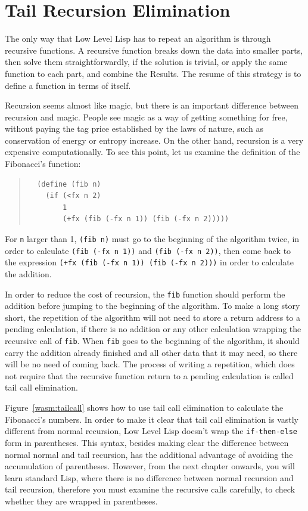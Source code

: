 \documentclass[a4paper,12pt]{book}
\begin{document}
\section{Tail Recursion Elimination}
The only way that Low Level Lisp has
to repeat an algorithm is through
recursive functions. A recursive function 
breaks down the data into smaller parts,
then solve them straightforwardly,
if the solution is trivial, or apply
the same function to each part, and combine
the Results. The resume of this strategy
is to define a function in terms of itself.

Recursion seems almost like magic, but there
is an important difference between recursion
and magic. People see magic as a way of getting
something for free, without paying the tag price
established by the laws of nature, such as 
conservation of energy or entropy increase.
On the other hand, recursion is a very expensive
computationally. To see this point, let us examine
the definition of the Fibonacci's function:
\begin{quote}
\begin{verbatim}
  (define (fib n)
    (if (<fx n 2)
        1
        (+fx (fib (-fx n 1)) (fib (-fx n 2)))))
\end{verbatim}
\end{quote}
For \verb|n| larger than 1, \verb|(fib n)| must
go to the beginning of the algorithm twice,
in order to calculate \verb|(fib (-fx n 1))|
and \verb|(fib (-fx n 2))|, then come back
to the expression
\verb|(+fx (fib (-fx n 1)) (fib (-fx n 2)))|
in order to calculate the addition.

In order to reduce the cost of recursion, the
\verb|fib| function should perform the addition
before jumping to the beginning of the algorithm.
To make a long story short, the repetition of the
algorithm will not need to store a return address
to a pending calculation, if there is no addition
or any other calculation wrapping the recursive
call of \verb|fib|. When \verb|fib| goes to the
beginning of the algorithm, it should carry the
addition already finished and all other data that it
may need, so there will be no need of coming back.
The process of writing a repetition, which does not
require that the recursive function return to
a pending calculation is called tail call elimination.

Figure~\ref{wasm:tailcall} shows how to use tail
call elimination to calculate the Fibonacci's numbers.
In order to make it clear that tail call elimination
is vastly different from normal recursion, Low Level
Lisp doesn't wrap the \verb|if-then-else| form in
parentheses. This syntax, besides making clear the
difference between normal normal and tail recursion,
has the additional advantage of avoiding the accumulation
of parentheses. However, from the next chapter onwards,
you will learn standard Lisp, where there is no difference
between normal recursion and tail recursion, therefore you
must examine the recursive calls carefully, to check
whether they are wrapped in parentheses.
\end{document}
